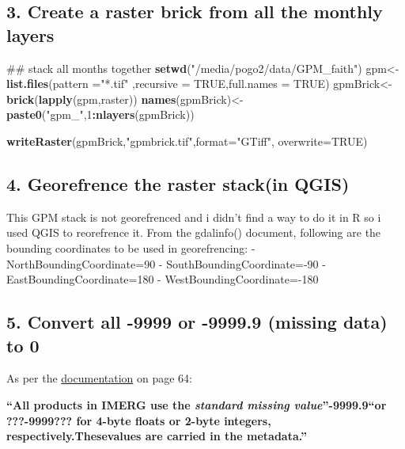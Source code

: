 \documentclass[]{article}
\newenvironment{Shaded}{\begin{snugshade}}{\end{snugshade}}
\newcommand{\KeywordTok}[1]{\textcolor[rgb]{0.13,0.29,0.53}{\textbf{#1}}}
\newcommand{\DataTypeTok}[1]{\textcolor[rgb]{0.13,0.29,0.53}{#1}}
\newcommand{\DecValTok}[1]{\textcolor[rgb]{0.00,0.00,0.81}{#1}}
\newcommand{\StringTok}[1]{\textcolor[rgb]{0.31,0.60,0.02}{#1}}
\newcommand{\OtherTok}[1]{\textcolor[rgb]{0.56,0.35,0.01}{#1}}
\newcommand{\OperatorTok}[1]{\textcolor[rgb]{0.81,0.36,0.00}{\textbf{#1}}}
\newcommand{\NormalTok}[1]{#1}
\begin{document}
\subsection{3. Create a raster brick from all the monthly
layers}\label{create-a-raster-brick-from-all-the-monthly-layers}

\begin{Shaded}
\begin{Highlighting}[]
\NormalTok{## stack all months together}
\KeywordTok{setwd}\NormalTok{(}\StringTok{"/media/pogo2/data/GPM_faith"}\NormalTok{)}
\NormalTok{gpm<-}\KeywordTok{list.files}\NormalTok{(}\DataTypeTok{pattern =}\StringTok{"*.tif"}\NormalTok{ ,}\DataTypeTok{recursive =} \OtherTok{TRUE}\NormalTok{,}\DataTypeTok{full.names =} \OtherTok{TRUE}\NormalTok{)}
\NormalTok{gpmBrick<-}\KeywordTok{brick}\NormalTok{(}\KeywordTok{lapply}\NormalTok{(gpm,raster))}
\KeywordTok{names}\NormalTok{(gpmBrick)<-}\KeywordTok{paste0}\NormalTok{(}\StringTok{"gpm_"}\NormalTok{,}\DecValTok{1}\OperatorTok{:}\KeywordTok{nlayers}\NormalTok{(gpmBrick))}

\KeywordTok{writeRaster}\NormalTok{(gpmBrick,}\StringTok{"gpmbrick.tif"}\NormalTok{,}\DataTypeTok{format=}\StringTok{"GTiff"}\NormalTok{, }\DataTypeTok{overwrite=}\OtherTok{TRUE}\NormalTok{)}
\end{Highlighting}
\end{Shaded}

\subsection{4. Georefrence the raster stack(in
QGIS)}\label{georefrence-the-raster-stackin-qgis}

This GPM stack is not georefrenced and i didn't find a way to do it in R
so i used QGIS to reorefrence it. From the gdalinfo() document,
following are the bounding coordinates to be used in georefrencing: -
NorthBoundingCoordinate=90 - SouthBoundingCoordinate=-90 -
EastBoundingCoordinate=180 - WestBoundingCoordinate=-180

\subsection{5. Convert all -9999 or -9999.9 (missing data) to
0}\label{convert-all--9999-or--9999.9-missing-data-to-0}

As per the
\href{https://pmm.nasa.gov/sites/default/files/document_files/IMERG_doc_190909.pdf}{documentation}
on page 64:

\textbf{``All products in IMERG use the \emph{standard missing
value}''-9999.9``or ???-9999??? for 4-byte floats or 2-byte integers,
respectively.Thesevalues are carried in the metadata.''}
\end{document}
